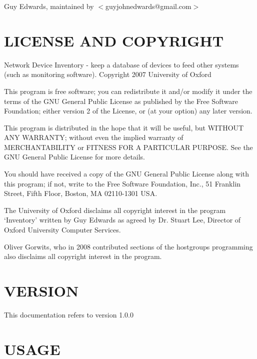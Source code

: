 \documentclass{book}
\begin{document}
Guy Edwards, maintained by $<$guyjohnedwards@gmail.com$>$


\section{LICENSE AND COPYRIGHT}
\label{_LICENSE_AND_COPYRIGHT}
\hypertarget{_LICENSE_AND_COPYRIGHT}{}



Network Device Inventory - keep a database of devices to feed other systems (such as monitoring software). Copyright 2007 University of Oxford



This program is free software; you can redistribute it and/or modify it under the terms of the GNU General Public License as published by the Free Software Foundation; either version 2 of the License, or (at your option) any later version.



This program is distributed in the hope that it will be useful, but WITHOUT ANY WARRANTY; without even the implied warranty of MERCHANTABILITY or FITNESS FOR A PARTICULAR PURPOSE. See the GNU General Public License for more details.



You should have received a copy of the GNU General Public License along with this program; if not, write to the Free Software Foundation, Inc., 51 Franklin Street, Fifth Floor, Boston, MA 02110-1301 USA.



The University of Oxford disclaims all copyright interest in the program `Inventory' written by Guy Edwards as agreed by Dr. Stuart Lee, Director of Oxford University Computer Services.



Oliver Gorwits, who in 2008 contributed sections of the hostgroups programming also disclaims all copyright interest in the program.




\section{VERSION}
\label{_VERSION}
\hypertarget{_VERSION}{}



This documentation refers to version 1.0.0


\section{USAGE}
\label{_USAGE}
\hypertarget{_USAGE}{}
\end{document}
